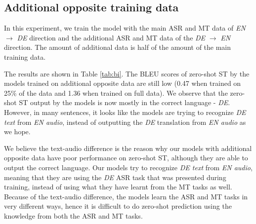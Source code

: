 \documentclass[conference]{IEEEtran}
\begin{document}
	\subsection{Additional opposite training data} 
	In this experiment, we train the model with the main ASR and MT data of \textit{EN} $\rightarrow$ \textit{DE} direction and the additional ASR and MT data of the \textit{DE} $\rightarrow$ \textit{EN} direction. 
	The amount of additional data is half of the amount of the main training data.
	
	The results are shown in Table \ref{tab:bi}. The BLEU scores of zero-shot ST by the models trained on additional opposite data are still low (0.47 when trained on 25\% of the data and 1.36 when trained on full data). We observe that the zero-shot ST output by the models is now mostly in the correct language - \textit{DE}. However, in many sentences, it looks like the models are trying to recognize \textit{DE text} from \textit{EN audio}, instead of outputting the \textit{DE} translation from \textit{EN audio} as we hope.
	
	We believe the text-audio difference is the reason why our models with additional opposite data have poor performance on zero-shot ST, although they are able to output the correct language. Our models try to recognize \textit{DE text} from \textit{EN audio}, meaning that they are using the \textit{DE} ASR task that was presented during training, instead of using what they have learnt from the MT tasks as well. Because of the text-audio difference, the models learn the ASR and MT tasks in very different ways, hence it is difficult to do zero-shot prediction using the knowledge from both the ASR and MT tasks.
	
\end{document}
